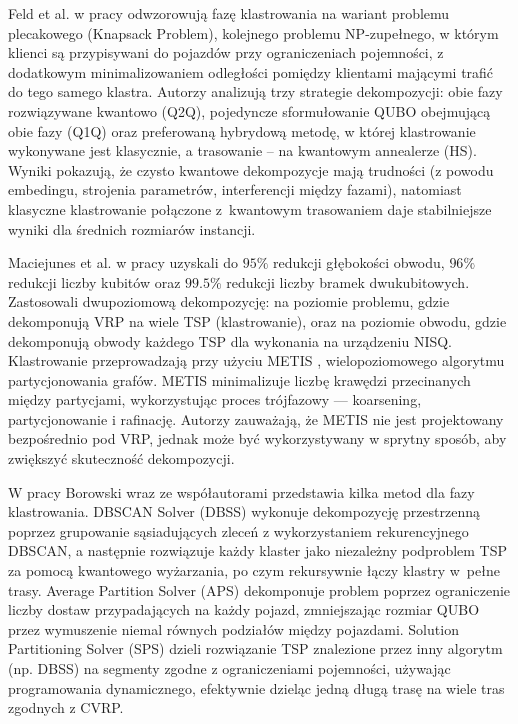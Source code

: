 Feld et al. w pracy \cite{Feld_2019} odwzorowują fazę klastrowania na wariant problemu plecakowego (Knapsack Problem), kolejnego problemu NP-zupełnego, w którym klienci są przypisywani do pojazdów przy ograniczeniach pojemności, z dodatkowym minimalizowaniem odległości pomiędzy klientami mającymi trafić do tego samego klastra. Autorzy analizują trzy strategie dekompozycji: obie fazy rozwiązywane kwantowo (Q2Q), pojedyncze sformułowanie QUBO obejmującą obie fazy (Q1Q) oraz preferowaną hybrydową metodę, w której klastrowanie wykonywane jest klasycznie, a trasowanie – na kwantowym annealerze (HS). Wyniki pokazują, że czysto kwantowe dekompozycje mają trudności (z powodu embedingu, strojenia parametrów, interferencji między fazami), natomiast klasyczne klastrowanie połączone z~kwantowym trasowaniem daje stabilniejsze wyniki dla średnich rozmiarów instancji.

Maciejunes et al. w pracy \cite{maciejunes2025solvinglargescalevehiclerouting} uzyskali do $95\%$ redukcji głębokości obwodu, $96\%$ redukcji liczby kubitów oraz $99.5\%$ redukcji liczby bramek dwukubitowych. Zastosowali dwupoziomową dekompozycję: na poziomie problemu, gdzie dekomponują VRP na wiele TSP (klastrowanie), oraz na poziomie obwodu, gdzie dekomponują obwody każdego TSP dla wykonania na urządzeniu NISQ. Klastrowanie przeprowadzają przy użyciu METIS \cite{metis}, wielopoziomowego algorytmu partycjonowania grafów. METIS minimalizuje liczbę krawędzi przecinanych między partycjami, wykorzystując proces trójfazowy — koarsening, partycjonowanie i rafinację. Autorzy zauważają, że METIS nie jest projektowany bezpośrednio pod VRP, jednak może być wykorzystywany w sprytny sposób, aby zwiększyć skuteczność dekompozycji.

W pracy \cite{Borowski2020} Borowski wraz ze współautorami przedstawia kilka metod dla fazy klastrowania. DBSCAN Solver (DBSS) wykonuje dekompozycję przestrzenną poprzez grupowanie sąsiadujących zleceń z wykorzystaniem rekurencyjnego DBSCAN, a następnie rozwiązuje każdy klaster jako niezależny podproblem TSP za pomocą kwantowego wyżarzania, po czym rekursywnie łączy klastry w~pełne trasy. Average Partition Solver (APS) dekomponuje problem poprzez ograniczenie liczby dostaw przypadających na każdy pojazd, zmniejszając rozmiar QUBO przez wymuszenie niemal równych podziałów między pojazdami. Solution Partitioning Solver (SPS) dzieli rozwiązanie TSP znalezione przez inny algorytm (np. DBSS) na segmenty zgodne z ograniczeniami pojemności, używając programowania dynamicznego, efektywnie dzieląc jedną długą trasę na wiele tras zgodnych z CVRP.

